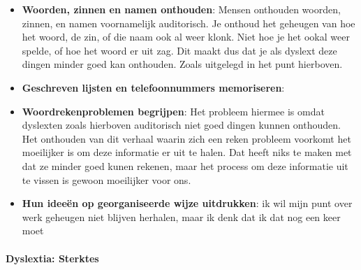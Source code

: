 \documentclass{article}
\begin{document}
\begin{itemize}
                        \item \textbf{Woorden, zinnen en namen onthouden}\cite{dyslextia-struggles-and-superpowers}:
                            Mensen onthouden woorden, zinnen, en namen voornamelijk auditorisch. Je onthoud het geheugen van hoe het woord, de zin, of die naam ook al weer klonk. Niet hoe je het ookal weer spelde, of hoe het woord er uit zag. Dit maakt dus dat je als dyslext deze dingen minder goed kan onthouden. Zoals uitgelegd in het punt hierboven.
                        \item \textbf{Geschreven lijsten en telefoonnummers memoriseren}\cite{dyslextia-struggles-and-superpowers}:
                        \item \textbf{Woordrekenproblemen begrijpen}\cite{dyslextia-struggles-and-superpowers}:
                            Het probleem hiermee is omdat dyslexten zoals hierboven auditorisch niet goed dingen kunnen onthouden. Het onthouden van dit verhaal waarin zich een reken probleem voorkomt het moeilijker is om deze informatie er uit te halen. Dat heeft niks te maken met dat ze minder goed kunen rekenen, maar het process om deze informatie uit te vissen is gewoon moeilijker voor ons.
                        \item \textbf{Hun ideeën op georganiseerde wijze uitdrukken}\cite{dyslextia-struggles-and-superpowers}:
                            ik wil mijn punt over werk geheugen niet blijven herhalen, maar ik denk dat ik dat nog een keer moet
                    \end{itemize}
                    \bigskip
                \noindent\paragraph{Dyslextia: Sterktes}\\
\end{document}
